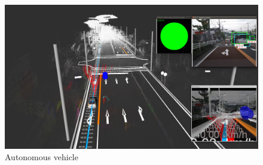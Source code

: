  \begin{figure}
 	\includegraphics[width=\columnwidth]{figures/apex_planning.png}
 	\caption{Autonomous vehicle}
 \end{figure}
 
 
 
 
